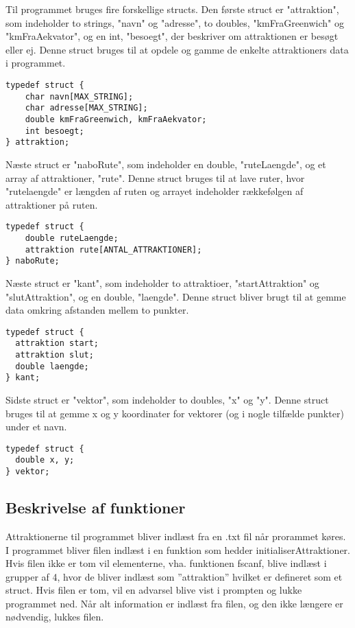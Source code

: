 Til programmet bruges fire forskellige structs. Den første struct er "attraktion", som indeholder to strings, "navn" og "adresse", to doubles, "kmFraGreenwich" og "kmFraAekvator", og en int, "besoegt", der beskriver om attraktionen er besøgt eller ej. Denne struct bruges til at opdele og gamme de enkelte attraktioners data i programmet.

\begin{lstlisting}
typedef struct {
	char navn[MAX_STRING];
	char adresse[MAX_STRING]; 
	double kmFraGreenwich, kmFraAekvator;
	int besoegt;
} attraktion;
\end{lstlisting} 

Næste struct er "naboRute", som indeholder en double, "ruteLaengde", og et array af attraktioner, "rute". Denne struct bruges til at lave ruter, hvor "rutelaengde" er længden af ruten og arrayet indeholder rækkefølgen af attraktioner på ruten.

\begin{lstlisting}
typedef struct {
	double ruteLaengde;
	attraktion rute[ANTAL_ATTRAKTIONER];
} naboRute;
\end{lstlisting}

Næste struct er "kant", som indeholder to attraktioer, "startAttraktion" og "slutAttraktion", og en double, "laengde". Denne struct bliver brugt til at gemme data omkring afstanden mellem to punkter.

\begin{lstlisting}
typedef struct {
  attraktion start;
  attraktion slut;
  double laengde;
} kant;
\end{lstlisting}

Sidste struct er "vektor", som indeholder to doubles, "x" og "y". Denne struct bruges til at gemme x og y koordinater for vektorer (og i nogle tilfælde punkter) under et navn.

\begin{lstlisting}
typedef struct {
  double x, y;
} vektor;
\end{lstlisting}

\subsection{Beskrivelse af funktioner}
Attraktionerne til programmet bliver indlæst fra en .txt fil når prorammet køres. I programmet bliver filen indlæst i en funktion som hedder initialiserAttraktioner. Hvis filen ikke er tom vil elementerne, vha. funktionen fscanf, blive indlæst i grupper af 4, hvor de bliver indlæst som ”attraktion” hvilket er defineret som et struct. Hvis filen er tom, vil en advarsel blive vist i prompten og lukke programmet ned. Når alt information er indlæst fra filen, og den ikke længere er nødvendig, lukkes filen.

